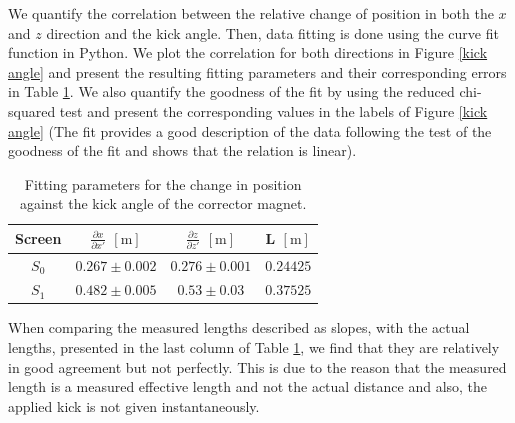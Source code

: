 \documentclass[12pt]{article}
\begin{document}
We quantify the correlation between the relative change of position in both the $x$ and $z$ direction and the kick angle. Then, data fitting is done using the curve fit function in Python. We plot the correlation for both directions in Figure \ref{kick angle} and present the resulting fitting parameters and their corresponding errors in Table \ref{tab1}. We also quantify the goodness of the fit by using the reduced chi-squared test and present the corresponding values in the labels of Figure \ref{kick angle} (The fit provides a good description of the data following the test of the goodness of the fit and shows that the relation is linear). 
\begin{table}[H]
    \centering
    \begin{tabular}{c|c|c|c}
    \hline
    \hline
         Screen & $\frac{\partial x}{\partial x'}$ $\mathrm{[m]}$ & $\frac{\partial z}{\partial z'}$ $\mathrm{[m]}$ & L $\mathrm{[m]}$ \\ 
    \hline
        $S_{0}$ & $0.267 \pm 0.002$ & $0.276 \pm 0.001$ & $0.24425$ \\ 
        $S_{1}$ & $0.482 \pm 0.005$ & $0.53 \pm 0.03$ & $0.37525$ \\ 
        \hline
    \end{tabular}
    
    \caption{Fitting parameters for the change in position against the kick angle of the corrector magnet.}
    \label{tab1}
\end{table}

When comparing the measured lengths described as slopes, with the actual lengths, presented in the last column of Table \ref{tab1}, we find that they are relatively in good agreement but not perfectly. This is due to the reason that the measured length is a measured effective length and not the actual distance and also, the applied kick is not given instantaneously.   
\end{document}
